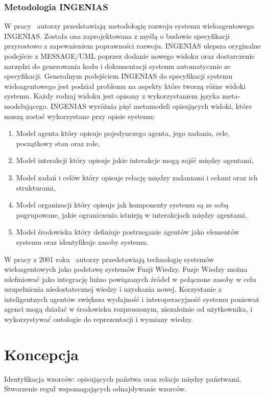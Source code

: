 \documentclass[11pt]{report}
\begin{document}
    \subsection{Metodologia INGENIAS}
    W pracy~\cite{Pavon2003} autorzy przedstawiają metodologię rozwoju systemu wieloagentowego INGENIAS\@.
    Została ona zaprojektowana z myślą o budowie specyfikacji przyrostowo z zapewnieniem poprawności rozwoju.
    INGENIAS ulepsza oryginalne podejście z MESSAGE/UML poprzez dodanie nowego widoku oraz dostarczenie narzędzi do generowania kodu i dokumentacji systemu automatycznie ze specyfikacji.
    Generalnym podejściem INGENIAS do specyfikacji systemu wieloagentowego jest podział problemu na aspekty które tworzą różne widoki systemu.
    Każdy rodzaj widoku jest opisany z wykorzystaniem języka meta-modelującego.
    INGENIAS wyróżnia pięć metamodeli opisujących widoki, które muszą zostać wykorzystane przy opisie systemu:
    \begin{enumerate}
        \item Model agenta który opisuje pojedynczego agenta, jego zadania, cele, początkowy stan oraz role,
        \item Model interakcji który opisuje jakie interakcje mogą zajść między agentami,
        \item Model zadań i celów który opisuje relację między zadaniami i celami oraz ich strukturami,
        \item Model organizacji który opisuje jak komponenty systemu są ze sobą pogrupowane, jakie ograniczenia istnieją w interakcjach między agentami,
        \item Model środowiska który definiuje postrzeganie agentów jako elementów systemu oraz identyfikuje zasoby systemu.
    \end{enumerate}

    W pracy z 2001 roku~\cite{Smirnov2002} autorzy przedstawiają technologię systemów wieloagentowych jako podstawę systemów Fuzji Wiedzy.
    Fuzje Wiedzy można zdefiniować jako integrację luźno powiązanych źródeł w połączone zasoby w celu uzupełnienia niedostatecznej wiedzy i uzyskania nowej.
    Korzystanie z inteligentnych agentów zwiększa wydajność i interoperacyjność systemu ponieważ agenci mogą działać w środowisku rozproszonym, niezależnie od użytkownika, i wykorzystywać
    ontologie do reprezentacji i wymiany wiedzy.


    \chapter{Koncepcja}\label{ch:koncepcja}
    Identyfikacja wzorców: opisujących państwa oraz relacje między państwami.
    Stworzenie reguł wspomagających odnajdywanie wzorców.
\end{document}
